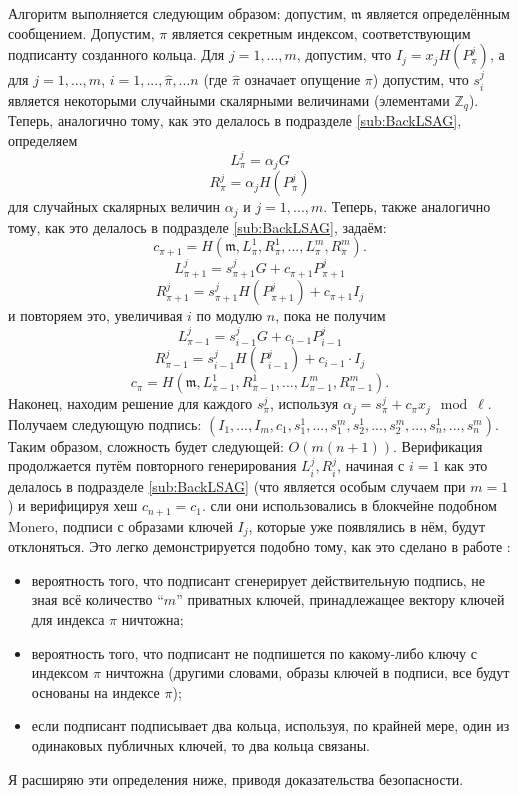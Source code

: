 \documentclass{mrl}
\theoremstyle{definition}
\numberwithin{thm}{section}
\begin{document}
Алгоритм выполняется следующим образом: допустим, $\mathfrak{m}$ является определённым сообщением. Допустим, $\pi$ является секретным индексом, соответствующим подписанту созданного кольца. Для $j=1,...,m$, допустим, что $I_{j}=x_{j}H\left(P_{\pi}^{j}\right)$, а для $j=1,...,m$, $i=1,...,\hat{\pi},...n$ (где $\hat{\pi}$ означает опущение $\pi$) допустим, что $s_{i}^{j}$ является некоторыми случайными скалярными величинами (элементами $\mathbb{Z}_q$). Теперь, аналогично тому, как это делалось в подразделе \ref{sub:BackLSAG}, определяем
\[
L_{\pi}^{j}=\alpha_{j}G
\]
\[
R_{\pi}^{j}=\alpha_{j}H\left(P_{\pi}^{j}\right)
\]
для случайных скалярных величин $\alpha_j$ и $j=1,...,m$. Теперь, также аналогично тому, как это делалось в подразделе \ref{sub:BackLSAG}, задаём:
\[
c_{\pi+1}=H\left(\mathfrak{m},L_{\pi}^{1},R_{\pi}^{1},...,L_{\pi}^{m},R_{\pi}^{m}\right).
\]
\[
L_{\pi+1}^{j}=s_{\pi+1}^{j}G+c_{\pi+1}P_{\pi+1}^{j}
\]
\[
R_{\pi+1}^{j}=s_{\pi+1}^{j}H\left(P_{\pi+1}^{j}\right)+c_{\pi+1}I_{j}
\]
и повторяем это, увеличивая $i$ по модулю $n$, пока не получим
\[
L_{\pi-1}^{j}=s_{i-1}^{j}G+c_{i-1}P_{i-1}^{j}
\]
\[
R_{\pi-1}^{j}=s_{i-1}^{j}H\left(P_{i-1}^{j}\right)+c_{i-1}\cdot I_{j}
\]
\[
c_{\pi}=H\left(\mathfrak{m},L_{\pi-1}^{1},R_{\pi-1}^{1},...,L_{\pi-1}^{m},R_{\pi-1}^{m}\right).
\]
Наконец, находим решение для каждого $s_{\pi}^{j}$, используя $\alpha_{j}=s_{\pi}^{j}+c_{\pi}x_{j} \mod \ell$.
Получаем следующую подпись: $\left(I_{1},...,I_{m},c_{1},s_{1}^{1},...,s_{1}^{m},s_{2}^{1},...,s_{2}^{m},...,s_{n}^{1},...,s_{n}^{m}\right)$. Таким образом, сложность будет следующей: $O\left(m\left(n+1\right)\right).$
Верификация продолжается путём повторного генерирования $L_{i}^{j},R_{i}^{j}$, начиная с $i=1$ как это делалось в подразделе \ref{sub:BackLSAG} (что является особым случаем при $m=1$) и верифицируя хеш $c_{n+1}=c_{1}.$ сли они использовались в блокчейне подобном Monero, подписи с образами ключей $I_j$, которые уже появлялись в нём, будут отклоняться. Это легко демонстрируется подобно тому, как это сделано в работе \cite{LWW}:
\begin{itemize}
\item вероятность того, что подписант сгенерирует действительную подпись, не зная всё количество ``$m$'' приватных ключей, принадлежащее вектору ключей для индекса $\pi$ ничтожна;
\item вероятность того, что подписант не подпишется по какому-либо ключу с индексом $\pi$ ничтожна (другими словами, образы ключей в подписи, все будут основаны на индексе $\pi$);
\item если подписант подписывает два кольца, используя, по крайней мере, один из одинаковых публичных ключей, то два кольца связаны.
\end{itemize}
Я расширяю эти определения ниже, приводя доказательства безопасности.
\end{document}
